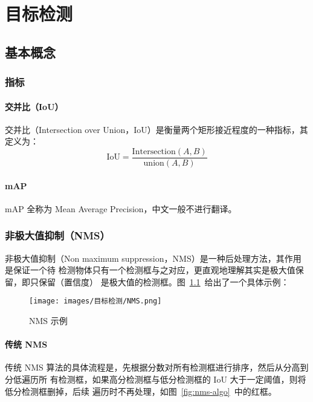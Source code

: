 \part{目标检测}
\chapter{基本概念}

\section{指标}

\subsection{交并比（IoU）}
交并比（Intersection over Union，IoU）是衡量两个矩形接近程度的一种指标，其定义为：
\begin{equation}
  \label{equ:IoU}
  \mathrm{IoU} = \frac{\mathrm{Intersection}(A, B)}{\mathrm{union}(A, B)}
\end{equation}

\subsection{mAP}
mAP 全称为 Mean Average Precision，中文一般不进行翻译。

\section{非极大值抑制（NMS）}

非极大值抑制（Non maximum suppression，NMS）是一种后处理方法，其作用是保证一个待
检测物体只有一个检测框与之对应，更直观地理解其实是极大值保留，即只保留（置信度）
是极大值的检测框。图~\ref{fig:nms}~给出了一个具体示例：

\begin{figure}[ht]
  \centering
  \texttt{[image: images/目标检测/NMS.png]}
  \caption{NMS 示例}
  \label{fig:nms}
\end{figure}

\subsection{传统 NMS}

传统 NMS 算法的具体流程是，先根据分数对所有检测框进行排序，然后从分高到分低遍历所
有检测框，如果高分检测框与低分检测框的 IoU 大于一定阈值，则将低分检测框删掉，后续
遍历时不再处理，如图~\ref{fig:nms-algo}~中的红框。


